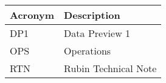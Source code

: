 \addtocounter{table}{-1}
\begin{longtable}{p{}p{}}\hline
\textbf{Acronym} & \textbf{Description}  \\\hline

DP1 & Data Preview 1 \\\hline
OPS & Operations \\\hline
RTN & Rubin Technical Note \\\hline
\end{longtable}
